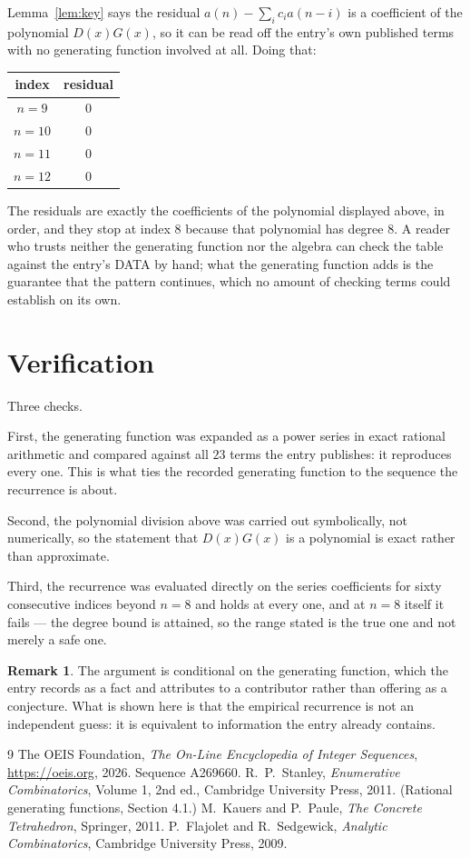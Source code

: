 \documentclass[11pt,a4paper]{article}
\theoremstyle{plain}
\theoremstyle{definition}
\newtheorem{remark}[theorem]{Remark}
\begin{document}
Lemma~\ref{lem:key} says the residual $a(n)-\sum_ic_ia(n-i)$ is a coefficient of the
polynomial $D(x)G(x)$, so it can be read off the entry's own published terms with no
generating function involved at all. Doing that:
\begin{center}
\begin{tabular}{cc}
index & residual \\ \hline
$n=9$ & $0$ \\
$n=10$ & $0$ \\
$n=11$ & $0$ \\
$n=12$ & $0$
\end{tabular}
\end{center}
The residuals are exactly the coefficients of the polynomial displayed above, in order, and
they stop at index $8$ because that polynomial has degree $8$. A reader who trusts
neither the generating function nor the algebra can check the table against the entry's DATA
by hand; what the generating function adds is the guarantee that the pattern continues, which
no amount of checking terms could establish on its own.

\section{Verification}

Three checks.

First, the generating function was expanded as a power series in exact rational arithmetic and
compared against all $23$ terms the entry publishes: it reproduces every one. This is
what ties the recorded generating function to the sequence the recurrence is about.

Second, the polynomial division above was carried out symbolically, not numerically, so the
statement that $D(x)G(x)$ is a polynomial is exact rather than approximate.

Third, the recurrence was evaluated directly on the series coefficients for sixty consecutive
indices beyond $n=8$ and holds at every one, and at $n=8$ itself it fails --- the
degree bound is attained, so the range stated is the true one and not merely a safe one.

\begin{remark}
The argument is conditional on the generating function, which the entry records as a fact and
attributes to a contributor rather than offering as a conjecture. What is shown here is that
the empirical recurrence is not an independent guess: it is equivalent to information the
entry already contains.
\end{remark}

\begin{thebibliography}{9}
 The OEIS Foundation, \emph{The On-Line Encyclopedia of Integer
Sequences}, \url{https://oeis.org}, 2026. Sequence A269660.
 R.~P.~Stanley, \emph{Enumerative Combinatorics}, Volume 1, 2nd ed.,
Cambridge University Press, 2011. (Rational generating functions, Section 4.1.)
 M.~Kauers and P.~Paule, \emph{The Concrete Tetrahedron}, Springer, 2011.
 P.~Flajolet and R.~Sedgewick, \emph{Analytic Combinatorics}, Cambridge
University Press, 2009.
\end{thebibliography}
\end{document}
